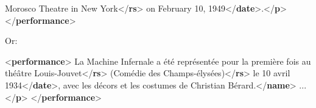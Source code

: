 \begin{shaded}
Morosco Theatre in New York{</\textbf{rs}>} on\mbox{}\newline 
{}February 10, 1949{</\textbf{date}>}.{</\textbf{p}>}\mbox{}\newline 
{</\textbf{performance}>}\end{shaded}\egroup\par \noindent       Or: \par\bgroup{}\exampleFont \begin{shaded}\noindent\mbox{}{<\textbf{performance}>}\mbox{}\newline 
{}La Machine Infernale a été\mbox{}\newline 
\hspace*{1em}\hspace*{1em} représentée pour la première fois au\mbox{}\newline 
{}théâtre Louis-Jouvet{</\textbf{rs}>}\mbox{}\newline 
\hspace*{1em}(Comédie des\mbox{}\newline 
\hspace*{1em}\hspace*{1em}\hspace*{1em}\hspace*{1em} Champs-élysées){</\textbf{rs}>}\mbox{}\newline 
\hspace*{1em}le 10 avril 1934{</\textbf{date}>},\mbox{}\newline 
\hspace*{1em}\hspace*{1em} avec les décors et les costumes de\mbox{}\newline 
{}Christian Bérard.{</\textbf{name}>} ... {</\textbf{p}>}\mbox{}\newline 
{</\textbf{performance}>}\end{shaded}\egroup\par \noindent  
